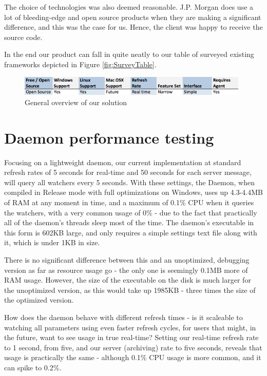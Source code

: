 \documentclass{l3proj}
\begin{document}
The choice of technologies was also deemed reasonable. J.P. Morgan does use a lot of bleeding-edge and open source products when they are making a significant difference, and this was the case for us. Hence, the client was happy to receive the source code.

In the end our product can fall in quite neatly to our table of surveyed existing frameworks depicted in Figure \ref{fig:SurveyTable}.

\begin{figure}[H]
\centering
\includegraphics[width=110mm]{Competitors/OurSolutionSurvey}
\caption{General overview of our solution}
\end{figure}


\section{Daemon performance testing}

Focusing on a lightweight daemon, our current implementation at standard refresh rates of 5 seconds for real-time and 50 seconds for each server message, will query all watchers every 5 seconds. 
With these settings, the Daemon, when compiled in Release mode with full optimizations on Windows, uses up 4.3-4.4MB of RAM at any moment in time, and a maximum of 0.1\% CPU when it queries the watchers, with a very common usage of 0\% - due to the fact that practically all of the daemon's threads sleep most of the time. The daemon's executable in this form is 602KB large, and only requires a simple settings text file along with it, which is under 1KB in size. 

There is no significant difference between this and an unoptimized, debugging version as far as resource usage go - the only one is seemingly 0.1MB more of RAM usage. However, the size of the executable on the disk is much larger for the unoptimized version, as this would take up 1985KB - three times the size of the optimized version.

How does the daemon behave with different refresh times - is it scaleable to watching all parameters using even faster refresh cycles, for users that might, in the future, want to see usage in true real-time?
Setting our real-time refresh rate to 1 second, from five, and our server (archiving) rate to five seconds, reveals that usage is practically the same - although 0.1\% CPU usage is more common, and it can spike to 0.2\%. 
\end{document}
